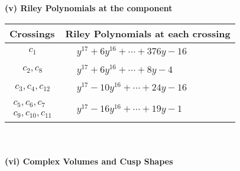 \documentclass[1p]{elsarticle_modified}
\theoremstyle{definition}
\begin{document}
\newpage\renewcommand{\arraystretch}{1}
\flushleft \textbf{(v) Riley Polynomials at the component}\newline \\
\begin{tabular}{m{50pt}|m{274pt}}
Crossings & \hspace{64pt}Riley Polynomials at each crossing \\
\hline $$\begin{aligned}c_{1}\end{aligned}$$&$\begin{aligned}
&y^{17}+6 y^{16}+\cdots+376 y-16
\end{aligned}$\\
\hline $$\begin{aligned}c_{2},c_{8}\end{aligned}$$&$\begin{aligned}
&y^{17}+6 y^{16}+\cdots+8 y-4
\end{aligned}$\\
\hline $$\begin{aligned}c_{3},c_{4},c_{12}\end{aligned}$$&$\begin{aligned}
&y^{17}-10 y^{16}+\cdots+24 y-16
\end{aligned}$\\
\hline $$\begin{aligned}c_{5},c_{6},c_{7}\\c_{9},c_{10},c_{11}\end{aligned}$$&$\begin{aligned}
&y^{17}-16 y^{16}+\cdots+19 y-1
\end{aligned}$\\
\hline
\end{tabular}\\~\\
\newpage\flushleft \textbf{(vi) Complex Volumes and Cusp Shapes}
\end{document}
